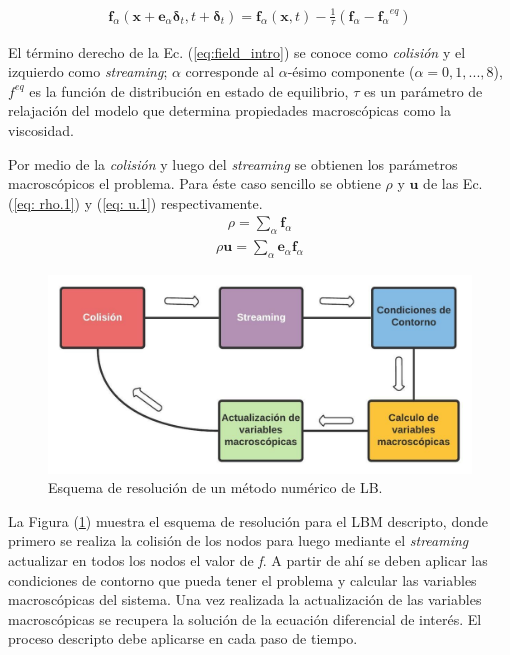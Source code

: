 \newpage


\begin{align}
	\mathbf{f}_{\alpha} (\mathbf{x} + \mathbf{e}_{\alpha} \mathbf{\delta}_{t}, t + \mathbf{\delta}_{t})  = \mathbf{f}_{\alpha} (\mathbf{x}, t) - \frac{1}{\tau} (\mathbf{f}_{\alpha} - {\mathbf{f}_{\alpha}}^{eq})
	\label{eq:field_intro} 
\end{align}

El término derecho de la Ec. (\ref{eq:field_intro}) se conoce como \textit{colisión} y el izquierdo como \textit{streaming}; $\alpha$ corresponde al  $\alpha$-ésimo componente  ($\alpha = 0, 1, ... ,8$), $f^{eq}$ es la función de distribución en estado de equilibrio, $\tau$ es un parámetro de relajación del modelo que determina propiedades macroscópicas como la viscosidad.

Por medio de la \textit{colisión} y luego del \textit{streaming} se obtienen los parámetros macroscópicos el problema. Para éste caso sencillo se obtiene $\rho$ y $\mathbf{u}$ de las Ec. (\ref{eq: rho.1}) y (\ref{eq: u.1}) respectivamente.
\begin{align}
	\rho = \sum_{\alpha} \mathbf{f}_{\alpha}
	\label{eq: rho.1}
\end{align}
\begin{align}
	\rho \mathbf{u}= \sum_{\alpha} \mathbf{e}_{\alpha} \mathbf{f}_{\alpha}
	\label{eq: u.1}
\end{align}

\begin{figure}[H]
	\centering
	\includegraphics[width=14cm]{figs/cap1/esquema_LBM}
	\caption{Esquema de resolución de un método numérico de LB.}
	\label{fig:esquema_lbm}
\end{figure}

La Figura (\ref{fig:esquema_lbm}) muestra el esquema de resolución para el LBM descripto, donde primero se realiza la colisión de los nodos para luego mediante el \textit{streaming} actualizar en todos los nodos el valor de \textit{f}. A partir de ahí se deben aplicar las condiciones de contorno que pueda tener el problema y calcular las variables macroscópicas del sistema. Una vez realizada la actualización de las variables macroscópicas se recupera la solución de la ecuación diferencial de interés. El proceso descripto debe aplicarse en cada paso de tiempo.

